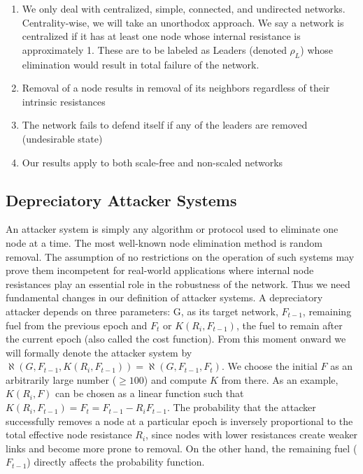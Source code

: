 \documentclass{article}
\begin{document}
	\begin{enumerate}
		\item {We only deal with centralized, simple, connected, and undirected networks.}
		Centrality-wise, we will take an unorthodox approach. We say a network is centralized if it has at least one node whose internal resistance is approximately 1. These are to be labeled as Leaders (denoted $\rho_L$) whose elimination would result in total failure of the network.
		\item {Removal of a node results in removal of its neighbors regardless of their intrinsic resistances}
		\item {The network fails to defend itself if any of the leaders are removed (undesirable state)}
		\item {Our results apply to both scale-free and non-scaled networks}
	\end{enumerate}
	
	\subsection{Depreciatory Attacker Systems}
	An attacker system is simply any algorithm or protocol used to eliminate one node at a time. The most well-known node elimination method is random removal. The assumption of no restrictions on the operation of such systems may prove them incompetent for real-world applications where internal node resistances play an essential role in the robustness of the network. Thus we need fundamental changes in our definition of attacker systems. A depreciatory attacker depends on three parameters: G, as its target network, $F_{t-1}$, remaining fuel from the previous epoch and $F_t$ or $K(R_{i},F_{t-1})$, the fuel to remain after the current epoch (also called the cost function). From this moment onward we will formally denote the attacker system by $\aleph(G,F_{t-1},K(R_{i},F_{t-1}))=\aleph(G,F_{t-1},F_t)$. We choose the initial $F$ as an arbitrarily large number ($ \geq 100$) and compute $K$ from there. As an example, $K(R_i,F)$ can be chosen as a linear function such that $K(R_i,F_{t-1})= F_{t} = F_{t-1} - R_i F_{t-1}$. 
	The probability that the attacker successfully removes a node at a particular epoch is inversely proportional to the total effective node resistance $R_i$, since nodes with lower resistances create weaker links and become more prone to removal. On the other hand, the remaining fuel ($F_{t-1}$) directly affects the probability function.
	
	\pagebreak
	
	
\end{document}
